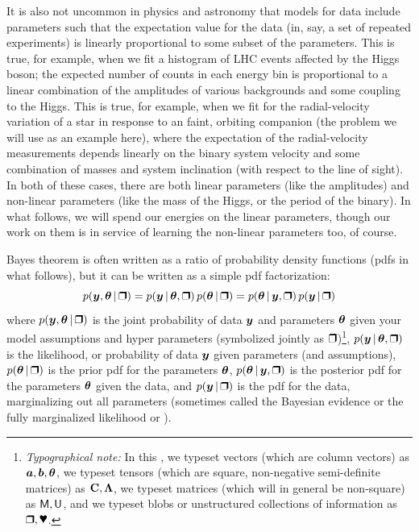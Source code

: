 It is also not uncommon in physics and astronomy that models for data
include parameters such that the expectation value for the data (in,
say, a set of repeated experiments) is linearly proportional to some
subset of the parameters.
This is true, for example, when we fit a histogram of LHC events
affected by the Higgs boson; the expected number of counts in each
energy bin is proportional to a linear combination of the amplitudes
of various backgrounds and some coupling to the Higgs.
This is true, for example, when we fit for the radial-velocity
variation of a star in response to an faint, orbiting companion (the
problem we will use as an example here), where the expectation of the
radial-velocity measurements depends linearly on the binary system
velocity and some combination of masses and system inclination (with
respect to the line of sight).
In both of these cases, there are both linear parameters (like the
amplitudes) and non-linear parameters (like the mass of the Higgs, or
the period of the binary).
In what follows, we will spend our energies on the linear parameters,
though our work on them is in service of learning the non-linear
parameters too, of course.

Bayes theorem is often written as a ratio of probability density
functions (pdfs in what follows), but it can be written as a simple
pdf factorization:
\begin{equation}
p(\vy,\vtheta\given\bH) = p(\vy\given\vtheta,\bH)\,p(\vtheta\given\bH) = p(\vtheta\given\vy,\bH)\,p(\vy\given\bH)
\end{equation}
where
$p(\vy,\vtheta\given\bH)$ is the joint probability of data $\boldsymbol{y}$ and
parameters $\boldsymbol{\theta}$ given your model assumptions and hyper parameters
(symbolized jointly as $\bH$)\footnote{%
\textsl{Typographical note:} In this \documentname, we
typeset vectors (which are column vectors) as $\boldsymbol{a}, \boldsymbol{b}, \boldsymbol{\theta}$, we typeset tensors (which
are square, non-negative semi-definite matrices) as $\mathbf{C}, \mathbf{\Lambda}$,
we typeset matrices (which will in general be non-square) as $\mathsf{M}, \mathsf{U}$,
and we typeset blobs or unstructured
collections of information as $\bH, \bP$.},
$p(\vy\given\vtheta,\bH)$ is the likelihood, or probability of data $\boldsymbol{y}$
given parameters (and assumptions),
$p(\vtheta\given\bH)$ is the prior pdf for the parameters $\boldsymbol{\theta}$,
$p(\vtheta\given\vy,\bH)$ is the posterior pdf for the parameters $\boldsymbol{\theta}$
given the data,
and
$p(\vy\given\bH)$ is the pdf for the data, marginalizing out all
parameters (sometimes called the Bayesian evidence or the fully
marginalized likelihood or \FML).


